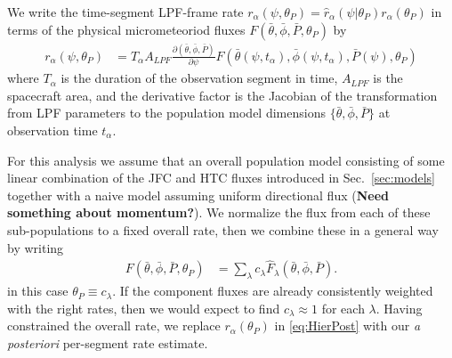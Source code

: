 \documentclass[twocolumn, trackchanges]{aastex62}
\begin{document}
 We write the time-segment LPF-frame rate $r_\alpha(\psi,\theta_P)=\hat r_\alpha(\psi|\theta_P)r_\alpha(\theta_P)$ in terms of the physical micrometeoriod fluxes $F(\bar\theta,\bar\phi,\bar P,\theta_P)$ by
\begin{align}
  r_\alpha(\psi,\theta_P)&=T_\alpha A_{LPF}\frac{\partial(\bar\theta,\bar\phi,\bar P)}{\partial\psi}F(\bar\theta(\psi,t_\alpha),\bar\phi(\psi,t_\alpha),\bar P(\psi),\theta_P)
\end{align}
where $T_\alpha$ is the duration of the observation segment in time, $A_{LPF}$ is the spacecraft area, and the derivative factor is the Jacobian of the transformation from LPF parameters to the population model dimensions $\{\bar\theta,\bar\phi,\bar P\}$ at observation time $t_\alpha$.

For this analysis we assume that an overall population model consisting of some linear combination of the JFC and HTC fluxes introduced in Sec.~\ref{sec:models} together with a naive model assuming uniform directional flux (\textbf{Need something about momentum?}). We normalize the flux from each of these sub-populations to a fixed overall rate, then we combine these in a general way by writing
\begin{align}
  F(\bar\theta,\bar\phi,\bar P,\theta_P)&=\sum_{\lambda} c_\lambda \hat F_\lambda(\bar\theta,\bar\phi,\bar P).\nonumber
\end{align}
in this case $\theta_P\equiv{c_\lambda}$.  If the component fluxes are already consistently weighted with the right rates, then we would expect to find $c_\lambda\approx1$ for each $\lambda$. Having constrained the overall rate, we replace $r_\alpha(\theta_P)$ in \eqref{eq:HierPost} with our \emph{a posteriori} per-segment rate estimate.
\\

\end{document}
